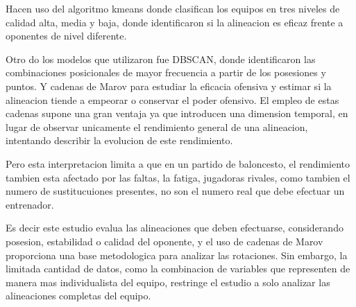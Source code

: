 Hacen uso del algoritmo kmeans donde clasifican los equipos en tres niveles de calidad alta, media y baja, donde identificaron si la alineacion es eficaz frente a oponentes de nivel diferente.

Otro do los modelos que utilizaron fue DBSCAN, donde identificaron las combinaciones posicionales de mayor frecuencia a partir de los posesiones y puntos. Y cadenas de Marov para estudiar la eficacia ofensiva y estimar si la alineacion tiende a empeorar o conservar el poder ofensivo. El empleo de estas cadenas supone una gran ventaja ya que introducen una dimension temporal, en lugar de observar unicamente el rendimiento general de una alineacion, intentando describir la evolucion de este rendimiento. 

Pero esta interpretacion limita a que en un partido de baloncesto, el rendimiento tambien esta afectado por las faltas, la fatiga, jugadoras rivales, como tambien el numero de sustitucuiones presentes, no son el numero real que debe efectuar un entrenador.

Es decir este estudio evalua las alineaciones que deben efectuarse, considerando posesion, estabilidad o calidad del oponente, y el uso de cadenas de Marov proporciona una base metodologica para analizar las rotaciones. Sin embargo, la limitada cantidad de datos, como la combinacion de variables que representen de manera mas individualista del equipo, restringe el estudio a solo analizar las alineaciones completas del equipo.

\cite{Chen17122023}